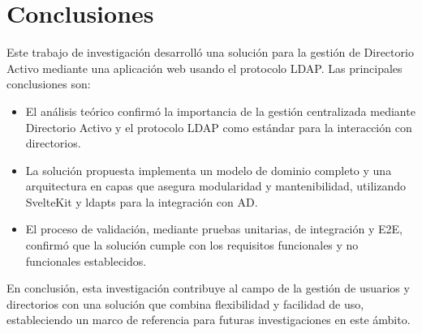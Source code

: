 \section{Conclusiones}

Este trabajo de investigación desarrolló una solución para la gestión de Directorio Activo mediante una aplicación web usando el protocolo LDAP. Las principales conclusiones son:

\begin{itemize}
    \item El análisis teórico confirmó la importancia de la gestión centralizada mediante Directorio Activo y el protocolo LDAP como estándar para la interacción con directorios.
    \item La solución propuesta implementa un modelo de dominio completo y una arquitectura en capas que asegura modularidad y mantenibilidad, utilizando SvelteKit y ldapts para la integración con AD.
    \item El proceso de validación, mediante pruebas unitarias, de integración y E2E, confirmó que la solución cumple con los requisitos funcionales y no funcionales establecidos.
\end{itemize}

En conclusión, esta investigación contribuye al campo de la gestión de usuarios y directorios con una solución que combina flexibilidad y facilidad de uso, estableciendo un marco de referencia para futuras investigaciones en este ámbito.
